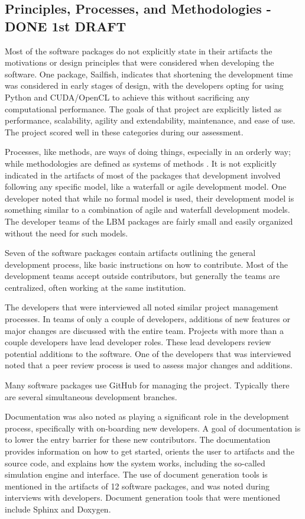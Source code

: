 \documentclass[12pt, notitlepage]{article}
\begin{document}
\subsection{Principles, Processes, and Methodologies - DONE 1st DRAFT}

Most of the software packages do not explicitly state in their artifacts the motivations or design principles that were considered when developing the software. One package, Sailfish, indicates that shortening the development time was considered in early stages of design, with the developers opting for using Python and CUDA/OpenCL to achieve this without sacrificing any computational performance. The goals of that project are explicitly listed as performance, scalability, agility and extendability, maintenance, and ease of use. The project scored well in these categories during our assessment.

Processes, like methods, are ways of doing things, especially in an orderly way; while methodologies are defined as systems of methods \citep{ghezzi1991fundamentals}. It is not explicitly indicated in the artifacts of most of the packages that development involved following any specific model, like a waterfall or agile development model. One developer noted that while no formal model is used, their development model is something similar to a combination of agile and waterfall development models. The developer teams of the LBM packages are fairly small and easily organized without the need for such models. 

Seven of the software packages contain artifacts outlining the general development process, like basic instructions on how to contribute. Most of the development teams accept outside contributors, but generally the teams are centralized, often working at the same institution. 

The developers that were interviewed all noted similar project management processes. In teams of only a couple of developers, additions of new features or major changes are discussed with the entire team. Projects with more than a couple developers have lead developer roles. These lead developers review potential additions to the software. One of the developers that was interviewed noted that a peer review process is used to assess major changes and additions.

Many software packages use GitHub for managing the project. Typically there are several simultaneous development branches.

Documentation was also noted as playing a significant role in the development process, specifically with on-boarding new developers. A goal of documentation is to lower the entry barrier for these new contributors. The documentation provides information on how to get started, orients the user to artifacts and the source code, and explains how the system works, including the so-called simulation engine and interface. The use of document generation tools is mentioned in the artifacts of 12 software packages, and was noted during interviews with developers. Document generation tools that were mentioned include Sphinx and Doxygen. 
\end{document}
